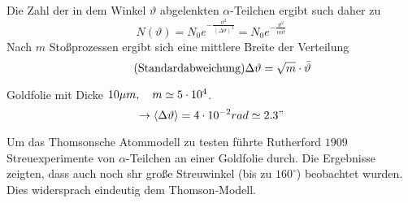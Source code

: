 Die Zahl der in dem Winkel $\vartheta$ abgelenkten $\alpha$-Teilchen ergibt
such daher zu
\begin{equation*}
    N(\vartheta) = N_0 e^{- \frac{\vartheta^2}{\left\langle \Delta \vartheta
    \right\rangle^2}} = N_0 e^{- \frac{\vartheta^2}{m\bar{\vartheta}}}
\end{equation*}
Nach $m$ Stoßprozessen ergibt sich eine mittlere Breite der Verteilung
\begin{equation*}
    \tag*{\text{(Standardabweichung)}}
    \Delta \vartheta = \sqrt{m} \cd \bar{\vartheta}
\end{equation*}
\begin{beis}
    Goldfolie mit Dicke $10 \mu m, \quad m \simeq 5 \cdot 10^4$.
    \begin{equation*}
        \rightarrow \left\langle \Delta \vartheta \right\rangle
        =
        4 \cdot 10^{-2} rad 
        \simeq 
        2.3"
    \end{equation*}
\end{beis}
Um das Thomsonsche Atommodell zu testen führte Rutherford $1909$
Streuexperimente von $\alpha$-Teilchen an einer Goldfolie durch. Die Ergebnisse
zeigten, dass auch noch shr große Streuwinkel (bis zu $160^{\circ}$) beobachtet
wurden. Dies widersprach eindeutig dem Thomson-Modell.



